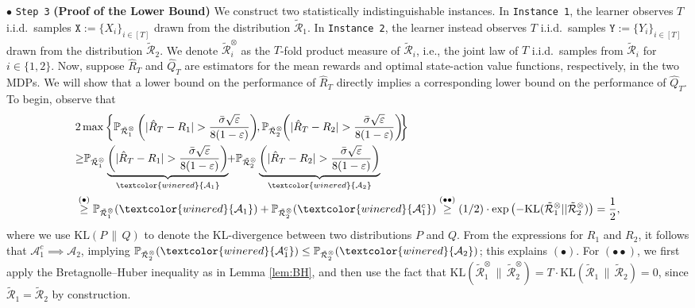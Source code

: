 \documentclass{article}
\newcommand{\mc}{\mathcal}
\begin{document}
\(\bullet\) \textcolor{winered}{\texttt{Step 3}} \textbf{(Proof of the Lower Bound)} We construct two statistically indistinguishable instances. In \texttt{Instance 1}, the learner observes \(T\) i.i.d.\ samples \(\texttt{X}:=\{X_i\}_{i \in [T]}\) drawn from the distribution \(\tilde{\mc{R}}_1\). In \texttt{Instance 2}, the learner instead observes \(T\) i.i.d.\ samples \(\texttt{Y}:=\{Y_i\}_{i \in [T]}\) drawn from the distribution \(\tilde{\mc{R}}_2\). We denote $\tilde{\mc{R}}_{i}^{\otimes}$ as the $T$-fold product measure of $\tilde{\mc{R}}_i$, i.e., the joint law of $T$ i.i.d.\ samples from $\tilde{\mc{R}}_i$ for \(i \in \{1,2\}\). Now, suppose $\hat{R}_T$ and $\hat{Q}_T$ are estimators for the mean rewards and optimal state-action value functions, respectively, in the two MDPs. We will show that a lower bound on the performance of $\hat{R}_T$ directly implies a corresponding lower bound on the performance of $\hat{Q}_T$. To begin, observe that
\begin{equation}\label{eqn:prob_bnd0}
\begin{aligned}
&2\max\left\{ \mathbb{P}_{\tilde{\mc{R}}_{1}^{\otimes}}\left(\vert \hat{R}_T - R_1 \vert > \frac{\bar{\sigma} \sqrt{\varepsilon}}{ 8 (1-\varepsilon)}\right)\hspace{-1mm},\mathbb{P}_{\tilde{\mc{R}}_{2}^{\otimes}}\hspace{-1mm}\left( \vert \hat{R}_T - R_2 \vert > \frac{\bar{\sigma} \sqrt{\varepsilon}}{ 8 (1-\varepsilon)} \right)\hspace{-1mm}\right\} \\
& {\geq}\mathbb{P}_{\tilde{\mc{R}}_{1}^{\otimes}} \underbrace{\left(\vert \hat{R}_T - R_1 \vert > \frac{\bar{\sigma} \sqrt{\varepsilon}}{ 8 (1-\varepsilon)} \right)}_{\textcolor{winered}{\mc{A}_1}}\hspace{-1mm}+\mathbb{P}_{\tilde{\mc{R}}_{2}^{\otimes}} \underbrace{\left( \vert \hat{R}_T - R_2 \vert > \frac{\bar{\sigma} \sqrt{\varepsilon}}{ 8 (1-\varepsilon)}\right)}_{\textcolor{winered}{\mc{A}_2}}\\
& \overset{(\bullet)}{\geq} \mathbb{P}_{\tilde{\mc{R}}_{1}^{\otimes}}(\textcolor{winered}{\mc{A}_1}) + \mathbb{P}_{\tilde{\mc{R}}_{2}^{\otimes}}(\textcolor{winered}{\mc{A}^c_1})  \overset{(\bullet  \bullet)}{\geq} (1/2) \cdot \exp\left(-\text{KL}(\tilde{\mc{R}}_{1}^{\otimes}||\tilde{\mc{R}}_{2}^{\otimes})\right) = \frac{1}{2},
\end{aligned}
\nonumber
\end{equation}
where we use $\mathrm{KL}(P \,\|\, Q)$ to denote the KL-divergence between two distributions $P$ and $Q.$ From the expressions for $R_1$ and $R_2$, it follows that $\mathcal{A}^c_1 \implies \mathcal{A}_2$, implying $\mathbb{P}_{\tilde{\mc{R}}_{2}^{\otimes}}(\textcolor{winered}{\mc{A}^c_1}) \leq \mathbb{P}_{\tilde{\mc{R}}_{2}^{\otimes}}(\textcolor{winered}{\mc{A}_2})$; this explains $(\bullet)$. For $(\bullet\bullet)$, we first apply the Bretagnolle--Huber inequality as in Lemma \ref{lem:BH}, and then use the fact that $\mathrm{KL}(\tilde{\mc{R}}_1^{\otimes} \,\|\, \tilde{\mc{R}}_2^{\otimes}) = T \cdot \mathrm{KL}(\tilde{\mc{R}}_1 \,\|\, \tilde{\mc{R}}_2) = 0$, since $\tilde{\mc{R}}_1 = \tilde{\mc{R}}_2$ by construction. 
\end{document}
